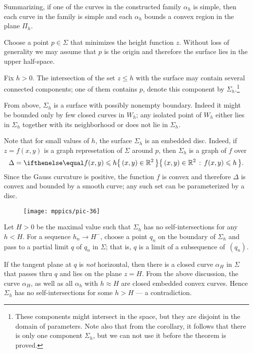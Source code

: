 Summarizing, if one of the curves in the constructed family $\alpha_{h}$ is simple,
then each curve in the family is simple and each $\alpha_{h}$ bounds a convex region in the plane $\Pi_h$. 

Choose a point $p\in \Sigma$ that minimizes the height function $z$.
Without loss of generality we may assume that $p$ is the origin and therefore the surface lies in the upper half-space.

Fix $h>0$.
The intersection of the set $z\le h$ with the surface may contain several connected components;
one of them contains $p$, denote this component by $\Sigma_h$.\footnote{These components might intersect in the space, but they are disjoint in the domain of parameters. Note also that from the corollary, it follows that there is only one component $\Sigma_h$, but we can not use it before the theorem is proved.}


From above, $\Sigma_h$ is a surface with possibly nonempty boundary.
Indeed it might be bounded only by few closed curves in $W_h$;
any isolated point of $W_h$ either lies in $\Sigma_h$ together with its neighborhood or does not lie in $\Sigma_h$.


Note that for small values of $h$, the surface $\Sigma_h$ is an embedded disc.
Indeed, if $z=f(x,y)$ is a graph represetation of $\Sigma$ around $p$,
then $\Sigma_h$ is a graph of $f$ over 
\[\Delta=\set{(x,y)\in\RR^2}{f(x,y)\le h}.\]
Since the Gauss curvature is positive, the function $f$ is convex and therefore $\Delta$ is convex and bounded by a smooth curve;
any such set can be parameterized by a disc.

\begin{wrapfigure}{o}{30 mm}
\vskip-0mm
\centering
\texttt{[image: mppics/pic-36]}
\vskip-0mm
\end{wrapfigure}

Let $H>0$ be the maximal value such that $\Sigma_h$ has no self-intersections for any $h<H$.
For a sequence $h_n\to H^-$, choose a point $q_n$ on the boundary of $\Sigma_h$ and pass to a partial limit $q$ of $q_n$ in $\Sigma$;
that is, $q$ is a limit of a subsequence of~$(q_n)$.

If the tangent plane at $q$ is \emph{not} horizontal, 
then there is a closed curve $\alpha_H$ in $\Sigma$ that passes thru $q$ and lies on the plane $z=H$.
From the above discussion, the curve $\alpha_H$, as well as all $\alpha_h$ with $h\approx H$ are closed embedded convex curves.
Hence $\Sigma_h$ has no self-intersections for some $h>H$ --- a contradiction.


